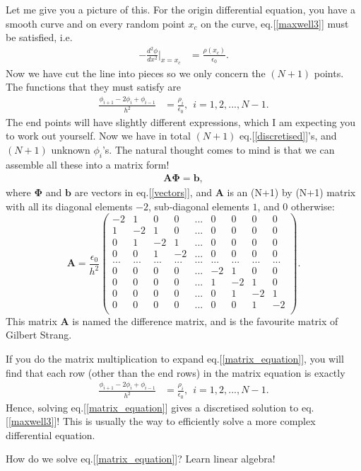 \documentclass[paper=a4,fontsize=11pt]{scrartcl} %
\begin{document}
Let me give you a picture of this. For the origin differential equation, you have a smooth curve and on every random point $x_c$ on the curve, eq.[\ref{maxwell3}] must be satisfied, i.e. 
\begin{align}\label{continuous}
    -\frac{d^2\phi}{dx^2}\Bigr|_{x=x_c} &= \frac{\rho(x_c)}{\epsilon_0}.
\end{align}
Now we have cut the line into pieces so we only concern the $(N+1)$ points. The functions that they must satisfy are
\begin{align}\label{discretised}
    \frac{\phi_{i+1} - 2\phi_i + \phi_{i-1}}{h^2} &= \frac{\rho_i}{\epsilon_0}, \ \  i=1, 2, ..., N-1.
\end{align}
The end points will have slightly different expressions, which I am expecting you to work out yourself. Now we have in total $(N+1)$ eq.[\ref{discretised}]'s, and$(N+1)$ unknown $\phi_i$'s. The natural thought comes to mind is that we can assemble all these into a matrix form!
\begin{align}\label{matrix_equation}
    \mathbf{A}\mathbf{\Phi} = \mathbf{b},
\end{align}
where $\mathbf{\Phi}$ and $\mathbf{b}$ are vectors in eq.[\ref{vectors}], and $\mathbf{A}$ is an (N+1) by (N+1) matrix with all its diagonal elements $-2$, sub-diagonal elements $1$, and $0$ otherwise:
\begin{equation}
\mathbf{A}=\frac{\epsilon_0}{h^2}
    \begin{pmatrix}
    -2 & 1 & 0 & 0 & ... & 0 & 0 & 0 & 0 \\
    1 & -2 & 1 & 0 & ... & 0 & 0 & 0 & 0 \\
    0 & 1 & -2 & 1 & ... & 0 & 0 & 0 & 0 \\
    0 & 0 & 1 & -2 &  ... & 0 & 0 & 0 & 0\\
    ... & ... & ... & ... & ... & ... & ... & ... & ...\\
    0 & 0 & 0 & 0 &  ... & -2 & 1 & 0 & 0\\
    0 & 0 & 0 & 0 &  ... & 1 & -2 & 1 & 0\\
    0 & 0 & 0 & 0 &  ... & 0 & 1 & -2 & 1\\
    0 & 0 & 0 & 0 &  ... & 0 & 0 & 1 & -2\\
    \end{pmatrix}.
\end{equation}
This matrix $\mathbf{A}$ is named the difference matrix, and is the favourite matrix of Gilbert Strang.

If you do the matrix multiplication to expand eq.[\ref{matrix_equation}], you will find that each row (other than the end rows) in the matrix equation is exactly 
\begin{align}
    \frac{\phi_{i+1} - 2\phi_i + \phi_{i-1}}{h^2} &= \frac{\rho_i}{\epsilon_0}, \ \ i=1, 2, ..., N-1.
\end{align}
Hence, solving eq.[\ref{matrix_equation}] gives a discretised solution to eq.[\ref{maxwell3}]! This is usually the way to efficiently solve a more complex differential equation. 

How do we solve eq.[\ref{matrix_equation}]? Learn linear algebra!
\end{document}
